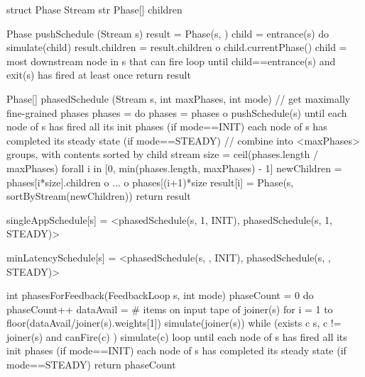 struct Phase {
  Stream str
  Phase[] children
}

Phase pushSchedule (Stream s) {
  result = Phase(s, {})
  child = entrance(s)
  do {
    simulate(child)
    result.children = result.children o child.currentPhase()
    child = most downstream node in s that can fire
  } loop until child==entrance(s) and exit(s) has fired at least once
  return result
}

Phase[] phasedSchedule (Stream s, int maxPhases, int mode) {
  // get maximally fine-grained phases
  phases = {}
  do {
    phases = phases o pushSchedule(s)
  } until {each node of s has fired all its init phases    (if mode==INIT)
           each node of s has completed its steady state   (if mode==STEADY) }
  // combine into <maxPhases> groups, with contents sorted by child stream
  size = ceil(phases.length / maxPhases)
  forall i in [0, min(phases.length, maxPhases) - 1] {
    newChildren = phases[i*size].children o ... o phases[(i+1)*size
    result[i] = Phase(s, sortByStream(newChildren))
  }
  return result
}

singleAppSchedule[s]  = <phasedSchedule(s, 1, INIT),
                         phasedSchedule(s, 1, STEADY)>

minLatencySchedule[s] = <phasedSchedule(s, \infty, INIT), 
                         phasedSchedule(s, \infty, STEADY)>

int phasesForFeedback(FeedbackLoop s, int mode) {
  phaseCount = 0
  do {
    phaseCount++
    dataAvail = # items on input tape of joiner(s)
    for i = 1 to floor(dataAvail/joiner(s).weights[1])
      simulate(joiner(s))
    while (exists c \in s, c != joiner(s) and canFire(c) )
      simulate(c)
  } loop until {each node of s has fired all its init phases    (if mode==INIT)
                each node of s has completed its steady state   (if mode==STEADY) }
  return phaseCount
}

